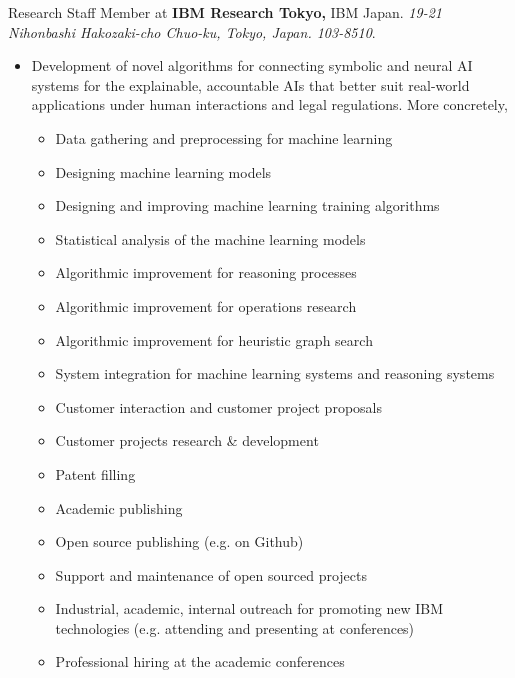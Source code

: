 \documentclass[letterpaper,11pt]{article}
\begin{document}
\begin{CV}
\item[04/01/2018--] Research Staff Member at \textbf{IBM Research Tokyo,} IBM Japan.
\emph{19-21 Nihonbashi Hakozaki-cho Chuo-ku, Tokyo, Japan. 103-8510}.

\begin{itemize}
 \item[Job description:]

              Development of novel algorithms for connecting symbolic
              and neural AI systems for the explainable, accountable AIs
              that better suit real-world applications under human
              interactions and legal regulations. More concretely,

              \begin{itemize}
               \item Data gathering and preprocessing for machine learning
               \item Designing machine learning models
               \item Designing and improving machine learning training algorithms
               \item Statistical analysis of the machine learning models
               \item Algorithmic improvement for reasoning processes
               \item Algorithmic improvement for operations research
               \item Algorithmic improvement for heuristic graph search
               \item System integration for machine learning systems and reasoning systems
               \item Customer interaction and customer project proposals
               \item Customer projects research \& development
               \item Patent filling
               \item Academic publishing
               \item Open source publishing (e.g. on Github)
               \item Support and maintenance of open sourced projects
               \item Industrial, academic, internal outreach for promoting new IBM technologies (e.g. attending and presenting at conferences)
               \item Professional hiring at the academic conferences

\end{itemize}
\end{itemize}
\end{CV}
\end{document}
